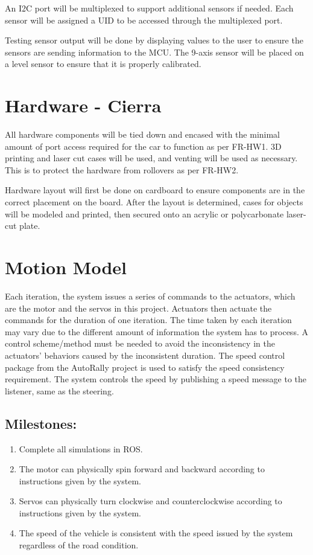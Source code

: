 \documentclass[compsoc,draftclsnofoot,onecolumn,10pt]{IEEEtran}
\begin{document}
An I2C port will be multiplexed to support additional sensors if needed. 
Each sensor will be assigned a UID to be accessed through the multiplexed port. \par

Testing sensor output will be done by displaying values to the user to ensure the sensors are sending information to the MCU. The 9-axis sensor will be placed on a level sensor to ensure that it is properly calibrated. \par

\section{Hardware - Cierra}
All hardware components will be tied down and encased with the minimal amount of port access required for the car to function as per FR-HW1. 3D printing and laser cut cases will be used, and venting will be used as necessary. This is to protect the hardware from rollovers as per FR-HW2. \par
Hardware layout will first be done on cardboard to ensure components are in the correct placement on the board. 
After the layout is determined, cases for objects will be modeled and printed, then secured onto an acrylic or polycarbonate laser-cut plate. \par

\section{Motion Model}
Each iteration, the system issues a series of commands to the actuators, which are the motor and the servos in this project. Actuators then actuate the commands for the duration of one iteration. The time taken by each iteration may vary due to the different amount of information the system has to process. A control scheme/method must be needed to avoid the inconsistency in the actuators’ behaviors caused by the inconsistent duration.
The speed control package from the AutoRally project is used to satisfy the speed consistency requirement. The system controls the speed by publishing a speed message to the listener, same as the steering.\par
\subsection{Milestones:}
\begin{enumerate}
	\item Complete all simulations in ROS.
	\item The motor can physically spin forward and backward according to instructions given by the system.
	\item Servos can physically turn clockwise and counterclockwise according to instructions given by the system.
	\item The speed of the vehicle is consistent with the speed issued by the system regardless of the road condition.
\end{enumerate} 
\end{document}
